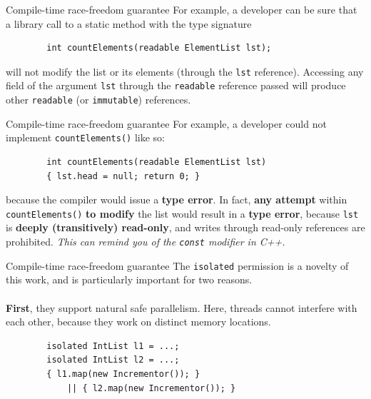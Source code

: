 \documentclass[handout]{beamer} %
\begin{document}

\begin{frame}[fragile]{Compile-time race-freedom guarantee}
	For example, a developer can be sure that a library call to a static
	method with the type signature
	\begin{lstlisting}
		int countElements(readable ElementList lst);
	\end{lstlisting}
	will not modify the list or its elements (through the \texttt{lst}
	reference).	Accessing any field of the argument \texttt{lst} through
	the \texttt{readable} reference passed will produce other \texttt{readable}
	(or \texttt{immutable}) references.
\end{frame}

\begin{frame}[fragile]{Compile-time race-freedom guarantee}
	For example, a developer could not	implement \texttt{countElements()}
	like so:
	\begin{lstlisting}
		int countElements(readable ElementList lst)
		{ lst.head = null; return 0; }
	\end{lstlisting}
	because the compiler would issue a \textbf{type error}. In fact,
	\textbf{any	attempt} within \texttt{countElements()} \textbf{to modify}
	the	list would result in a \textbf{type error}, because \texttt{lst} is
	\textbf{deeply (transitively) read-only}, and writes through read-only
	references are prohibited.
	\vfill
	\textit{This can remind you of the \texttt{const} modifier in C++.}
\end{frame}


\begin{frame}[fragile]{Compile-time race-freedom guarantee}
	The \texttt{isolated} permission is a novelty of this work, and
	is particularly important for two reasons.\\
	\pause ~\\
	\textbf{First}, they support natural safe parallelism. Here, threads
	cannot interfere with each other, because they work on distinct memory
	locations.
	\begin{lstlisting}
		isolated IntList l1 = ...;
		isolated IntList l2 = ...;
		{ l1.map(new Incrementor()); }
			|| { l2.map(new Incrementor()); }
	\end{lstlisting}
\end{frame}
\end{document}
